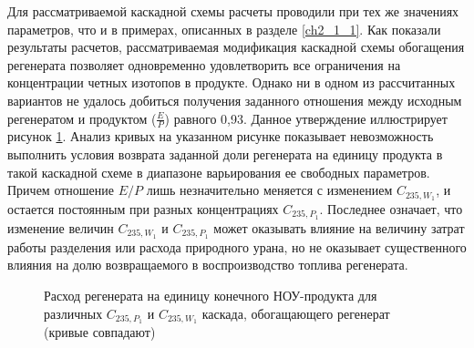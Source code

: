 Для рассматриваемой каскадной схемы расчеты проводили при тех же значениях параметров, что и в примерах, описанных в разделе \ref{ch2_1_1}. Как показали результаты расчетов, рассматриваемая модификация каскадной схемы обогащения регенерата позволяет одновременно удовлетворить все ограничения на концентрации четных изотопов в продукте. Однако ни в одном из рассчитанных вариантов не удалось добиться получения заданного отношения между исходным регенератом и продуктом ($\frac{E}{P}$) равного 0,93. Данное утверждение иллюстрирует рисунок \ref{Figure_10}. Анализ кривых на указанном рисунке показывает невозможность выполнить условия возврата заданной доли регенерата на единицу продукта в такой каскадной схеме в диапазоне варьирования ее свободных параметров. Причем отношение ${E}{/}{P}$ лишь незначительно меняется с изменением $C_{235, W_1}$, и остается постоянным при разных концентрациях $C_{235, P_1}$. Последнее означает, что изменение величин $C_{235, W_1}$ и $C_{235, P_1}$ может оказывать влияние на величину затрат работы разделения или расхода природного урана, но не оказывает существенного влияния на долю возвращаемого в воспроизводство топлива регенерата.

\begin{figure}[ht]
  \caption{Расход регенерата на единицу конечного НОУ-продукта для различных  $C_{235, P_1}$ и $C_{235, W_1}$ каскада, обогащающего регенерат (кривые совпадают)}\label{Figure_10}
\end{figure}


